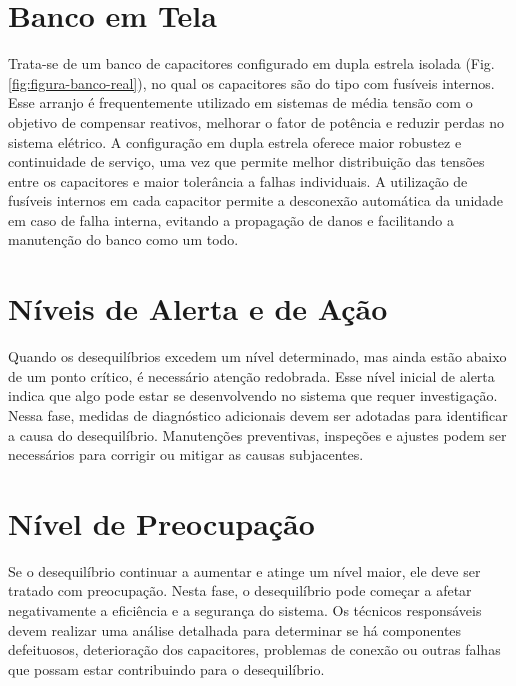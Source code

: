 \documentclass[a4paper]{article}
\begin{document}
\section{Banco em Tela}

Trata-se de um banco de capacitores configurado em dupla estrela isolada (Fig. \ref{fig:figura-banco-real}), no qual os capacitores são do tipo com fusíveis internos. Esse arranjo é frequentemente utilizado em sistemas de média tensão com o objetivo de compensar reativos, melhorar o fator de potência e reduzir perdas no sistema elétrico. A configuração em dupla estrela oferece maior robustez e continuidade de serviço, uma vez que permite melhor distribuição das tensões entre os capacitores e maior tolerância a falhas individuais. A utilização de fusíveis internos em cada capacitor permite a desconexão automática da unidade em caso de falha interna, evitando a propagação de danos e facilitando a manutenção do banco como um todo.

\begin{table}[htbp]
	\centering
	\renewcommand{\arraystretch}{1.25}
	\caption[]{Dados de Entrada do Banco de Capacitores.}
	
	\label{tab:tabela7_real}
\end{table}






\section{Níveis de Alerta e de Ação}
Quando os desequilíbrios excedem um nível determinado, mas ainda estão abaixo de um ponto crítico, é necessário atenção redobrada. Esse nível inicial de alerta indica que algo pode estar se desenvolvendo no sistema que requer investigação. Nessa fase, medidas de diagnóstico adicionais devem ser adotadas para identificar a causa do desequilíbrio. Manutenções preventivas, inspeções e ajustes podem ser necessários para corrigir ou mitigar as causas subjacentes.

\section{Nível de Preocupação}
Se o desequilíbrio continuar a aumentar e atinge um nível maior, ele deve ser tratado com preocupação. Nesta fase, o desequilíbrio pode começar a afetar negativamente a eficiência e a segurança do sistema. Os técnicos responsáveis devem realizar uma análise detalhada para determinar se há componentes defeituosos, deterioração dos capacitores, problemas de conexão ou outras falhas que possam estar contribuindo para o desequilíbrio.
\end{document}
